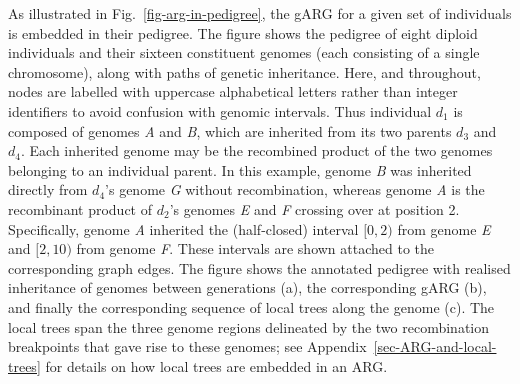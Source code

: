 \documentclass[9pt,twocolumn,twoside]{gsajnl}
\newcommand{\noderef}[1]{\textit{#1}}
\begin{document}
As illustrated in Fig.~\ref{fig-arg-in-pedigree},
the gARG for a given set of individuals is embedded in their pedigree.
The figure shows the pedigree of eight diploid individuals
and their sixteen constituent genomes (each consisting of a single chromosome),
along with paths of genetic inheritance.
Here, and throughout,
nodes are labelled with uppercase alphabetical letters
rather than integer identifiers to avoid confusion with genomic intervals.
Thus individual $d_1$ is composed
of genomes \noderef{A} and \noderef{B}, which are inherited from its
two parents $d_3$ and $d_4$. Each inherited genome may be the recombined product
of the two genomes belonging to an individual parent.
In this example,
genome \noderef{B} was inherited directly from $d_4$'s genome \noderef{G} without
recombination, whereas
genome \noderef{A} is the recombinant product of
$d_2$'s genomes \noderef{E} and \noderef{F} crossing over at position 2.
Specifically, genome \noderef{A} inherited the (half-closed)
interval $[0, 2)$ from genome \noderef{E} and $[2, 10)$ from genome \noderef{F}.
These intervals are shown attached to the corresponding graph edges.
The figure shows the annotated pedigree with realised inheritance of genomes
between generations (a), the corresponding gARG (b), and finally the corresponding
sequence of local trees along the
genome (c).
The local trees span the three genome regions delineated
by the two recombination breakpoints that gave rise to these genomes;
see Appendix~\ref{sec-ARG-and-local-trees} for details
on how local trees are embedded in an ARG.

\end{document}
